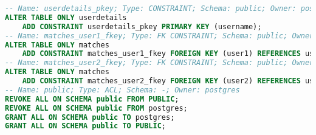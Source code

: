 \begin{lstlisting}[language=SQL]
-- Name: userdetails_pkey; Type: CONSTRAINT; Schema: public; Owner: postgres
ALTER TABLE ONLY userdetails
    ADD CONSTRAINT userdetails_pkey PRIMARY KEY (username);
-- Name: matches_user1_fkey; Type: FK CONSTRAINT; Schema: public; Owner: postgres
ALTER TABLE ONLY matches
    ADD CONSTRAINT matches_user1_fkey FOREIGN KEY (user1) REFERENCES userdetails(username);
-- Name: matches_user2_fkey; Type: FK CONSTRAINT; Schema: public; Owner: postgres
ALTER TABLE ONLY matches
    ADD CONSTRAINT matches_user2_fkey FOREIGN KEY (user2) REFERENCES userdetails(username);
-- Name: public; Type: ACL; Schema: -; Owner: postgres
REVOKE ALL ON SCHEMA public FROM PUBLIC;
REVOKE ALL ON SCHEMA public FROM postgres;
GRANT ALL ON SCHEMA public TO postgres;
GRANT ALL ON SCHEMA public TO PUBLIC;
\end{lstlisting}